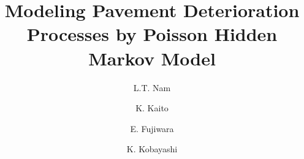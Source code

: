 \documentclass[a4paper,oneside,onecolumn,preprint,10pt,authoryear]{elsarticle}
\begin{document}
\begin{frontmatter}



\title{Modeling Pavement Deterioration Processes by Poisson Hidden Markov Model}

\author[nam]{L.T. Nam }
\author[kaito]{K. Kaito  }
\author[fujiwara]{E. Fujiwara}
\author[kobayashi]{K. Kobayashi}

\address[nam]{Frontier Research Center, Graduate School of Engineering, Osaka University, Japan}
\address[kaito]{Frontier Research Center, Graduate School of Engineering, Osaka University, Japan}
\address[fujiwara]{Department of Urban Management, Graduate School of Engineering, Kyoto University, Japan}
\address[kobayashi]{Department of Urban Management, Graduate School of Engineering,  Kyoto University, Japan}



\end{frontmatter}
\end{document}
